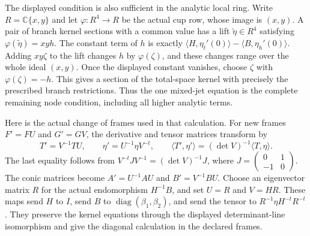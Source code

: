 The displayed condition is also sufficient in the analytic local ring.
Write $R=\mathbb C\{x,y\}$ and let $\varphi:R^4\to R$ be the
actual cup row, whose image is $(x,y)$. A pair of branch kernel sections
with a common value has a lift $\widetilde\eta\in R^4$ satisfying
$\varphi(\widetilde\eta)=xyh$. The constant term of $h$ is exactly
$\langle H,\eta_t'(0)\rangle-\langle B,\eta_h'(0)\rangle$.
Adding $xy\zeta$ to the lift changes $h$ by $\varphi(\zeta)$, and
these changes range over the whole ideal $(x,y)$. Once the displayed
constant vanishes, choose $\zeta$ with $\varphi(\zeta)=-h$.
This gives a section of the total-space kernel with precisely the
prescribed branch restrictions. Thus the one mixed-jet equation is the
complete remaining node condition, including all higher analytic terms.

Here is the actual change of frames used in that calculation.
For new frames $F'=FU$ and $G'=GV$, the derivative and tensor matrices
transform by
\[
 T'=V^{-1}TU,\qquad \eta'=U^{-1}\eta V^{-t},\qquad
 \langle T',\eta'\rangle=(\det V)^{-1}\langle T,\eta\rangle.
\]
The last equality follows from
$V^{-t}JV^{-1}=(\det V)^{-1}J$, where
$J=\left(\begin{smallmatrix}0&1\\-1&0\end{smallmatrix}\right)$.
The conic matrices become $A'=U^{-1}AU$ and $B'=V^{-1}BU$.
Choose an eigenvector matrix $R$ for the actual endomorphism $H^{-1}B$,
and set $U=R$ and $V=HR$. These maps send $H$ to $I$, send $B$ to
$\operatorname{diag}(\beta_1,\beta_2)$, and send the tensor to
$R^{-1}\eta H^{-t}R^{-t}$. They preserve the kernel equations through
the displayed determinant-line isomorphism and give the diagonal
calculation in the declared frames.
